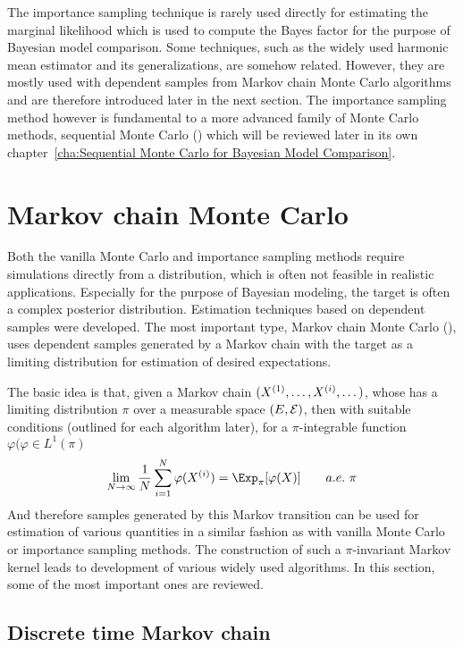 The importance sampling technique is rarely used directly for estimating the
marginal likelihood which is used to compute the Bayes factor for the purpose
of Bayesian model comparison. Some techniques, such as the widely used
harmonic mean estimator and its generalizations, are somehow related. However,
they are mostly used with dependent samples from Markov chain Monte Carlo
algorithms and are therefore introduced later in the next section. The
importance sampling method however is fundamental to a more advanced family of
Monte Carlo methods, sequential Monte Carlo (\smc) which will be reviewed
later in its own chapter~\ref{cha:Sequential Monte Carlo for Bayesian Model
  Comparison}.

\section{Markov chain Monte Carlo}
\label{sec:Markov chain Monte Carlo}

Both the vanilla Monte Carlo and importance sampling methods require
simulations directly from a distribution, which is often not feasible in
realistic applications. Especially for the purpose of Bayesian modeling, the
target is often a complex posterior distribution. Estimation techniques based
on dependent samples were developed. The most important type, Markov chain
Monte Carlo (\mcmc), uses dependent samples generated by a Markov chain with
the target as a limiting distribution for estimation of desired expectations.

The basic idea is that, given a Markov chain $(X^{(1)},\dots,X^{(i)},\dots)$,
whose has a limiting distribution $\pi$ over a measurable space $(E,\mathcal{E})$,
then with suitable conditions (outlined for each algorithm later), for a
$\pi$-integrable function $\varphi (\varphi
\in L^1(\pi)$
\begin{equation}
  \lim_{N\to\infty}\frac{1}{N}\sum_{i=1}^N\varphi(\Xiu) =
  \Exp_{\pi}[\varphi(X)]\qquad a.e.\ \pi
  \label{eq:mcmc convergence}
\end{equation}
And therefore samples generated by this Markov transition can be used for
estimation of various quantities in a similar fashion as with vanilla Monte
Carlo or importance sampling methods. The construction of such a
$\pi$-invariant Markov kernel leads to development of various widely used
\mcmc algorithms. In this section, some of the most important ones are
reviewed.

\subsection{Discrete time Markov chain}
\label{sub:Discrete time Markov chain}


